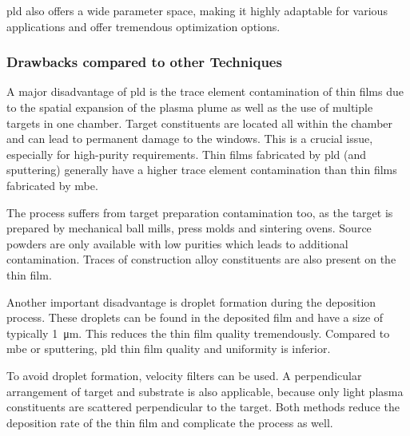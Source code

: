 \ac{pld} also offers a wide parameter space, making it highly adaptable for various 
applications and offer tremendous optimization options.

\subsubsection{Drawbacks compared to other Techniques}
A major disadvantage of \ac{pld} is the trace element contamination of 
thin films due to the spatial expansion of the plasma plume as well as the use of 
multiple targets in one chamber.
Target constituents are located all within the chamber and can lead to permanent damage 
to the windows.
This is a crucial issue, especially for high-purity requirements.
Thin films fabricated by \ac{pld} (and sputtering) generally have a higher trace element contamination 
than thin films fabricated by \ac{mbe}. 

The process suffers from target preparation contamination too, as the target is 
prepared by mechanical ball mills, press molds and sintering ovens.
Source powders are only available with low purities which leads to additional 
contamination. 
Traces of construction alloy constituents are also present on the thin film. 

Another important disadvantage is droplet formation during the deposition process.
These droplets can be found in the deposited film and have a size of typically
\qty{1}{\micro \meter}.
This reduces the thin film quality tremendously.
Compared to \ac{mbe} or sputtering, \ac{pld} thin film quality and uniformity 
is inferior.  

To avoid droplet formation, velocity filters can be used.
A perpendicular arrangement of target and substrate is also applicable, because only
light plasma constituents are scattered perpendicular to the target.
Both methods reduce the deposition rate of the thin film and complicate the process 
as well.
